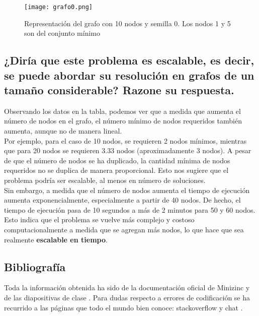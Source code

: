 \begin{figure}[H] %
	\centering
	\texttt{[image: grafo0.png]}
	\caption{Representación del grafo con 10 nodos y semilla 0. Los nodos 1 y 5 son del conjunto mínimo}
	\label{fig:grafo}
\end{figure}

\subsection{¿Diría que este problema es escalable, es decir, se puede abordar su resolución en grafos de un tamaño considerable? Razone su respuesta.}
Observando los datos en la tabla, podemos ver que a medida que aumenta el número de nodos en el grafo, el número mínimo de nodos requeridos también aumenta, aunque no de manera lineal.\\


Por ejemplo, para el caso de 10 nodos, se requieren 2 nodos mínimos, mientras que para 20 nodos se requieren 3.33 nodos (aproximadamente 3 nodos). A pesar de que el número de nodos se ha duplicado, la cantidad mínima de nodos requeridos no se duplica de manera proporcional. Esto nos sugiere que el problema podría ser escalable, al menos en número de soluciones.\\


Sin embargo, a medida que el número de nodos aumenta el tiempo de ejecución aumenta exponencialmente, especialmente a partir de 40 nodos. De hecho, el tiempo de ejecución pasa de 10 segundos a más de 2 minutos para 50 y 60 nodos. Esto indica que el problema se vuelve más complejo y costoso computacionalmente a medida que se agregan más nodos, lo que hace que  sea realmente \textbf{escalable en tiempo}.\\

\subsection{Bibliografía}
Toda la información obtenida ha sido de la documentación oficial de Minizinc \cite{minizinc} y de las diapositivas de clase \cite{mesejo}. Para dudas respecto a errores de codificación se ha recurrido a las páginas que todo el mundo bien conoce: stackoverflow \cite{stackoverflow} y chat \cite{chatgpt}.



